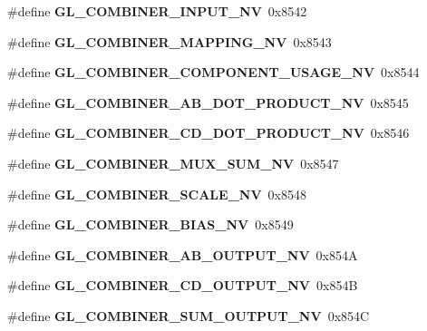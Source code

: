 \begin{DoxyCompactItemize}
\item 
\#define {\bfseries G\+L\+\_\+\+C\+O\+M\+B\+I\+N\+E\+R\+\_\+\+I\+N\+P\+U\+T\+\_\+\+N\+V}~0x8542\label{_s_d_l__opengl_8h_acf47936943c4cb3a44e7759ba589a2bb}

\item 
\#define {\bfseries G\+L\+\_\+\+C\+O\+M\+B\+I\+N\+E\+R\+\_\+\+M\+A\+P\+P\+I\+N\+G\+\_\+\+N\+V}~0x8543\label{_s_d_l__opengl_8h_a7b3d91e844bdfe508cb18e16b3b14c8f}

\item 
\#define {\bfseries G\+L\+\_\+\+C\+O\+M\+B\+I\+N\+E\+R\+\_\+\+C\+O\+M\+P\+O\+N\+E\+N\+T\+\_\+\+U\+S\+A\+G\+E\+\_\+\+N\+V}~0x8544\label{_s_d_l__opengl_8h_add52627ebaf78ad5374e17435b1bad64}

\item 
\#define {\bfseries G\+L\+\_\+\+C\+O\+M\+B\+I\+N\+E\+R\+\_\+\+A\+B\+\_\+\+D\+O\+T\+\_\+\+P\+R\+O\+D\+U\+C\+T\+\_\+\+N\+V}~0x8545\label{_s_d_l__opengl_8h_a962d60fe8d7c581e25b60ed55c426345}

\item 
\#define {\bfseries G\+L\+\_\+\+C\+O\+M\+B\+I\+N\+E\+R\+\_\+\+C\+D\+\_\+\+D\+O\+T\+\_\+\+P\+R\+O\+D\+U\+C\+T\+\_\+\+N\+V}~0x8546\label{_s_d_l__opengl_8h_ad15a48be9e3f50fd4a9692e76930e297}

\item 
\#define {\bfseries G\+L\+\_\+\+C\+O\+M\+B\+I\+N\+E\+R\+\_\+\+M\+U\+X\+\_\+\+S\+U\+M\+\_\+\+N\+V}~0x8547\label{_s_d_l__opengl_8h_a45deebc1bbaa4d760e611fa4e15f73a7}

\item 
\#define {\bfseries G\+L\+\_\+\+C\+O\+M\+B\+I\+N\+E\+R\+\_\+\+S\+C\+A\+L\+E\+\_\+\+N\+V}~0x8548\label{_s_d_l__opengl_8h_af593ab0f866947ed9f3903835ce7567e}

\item 
\#define {\bfseries G\+L\+\_\+\+C\+O\+M\+B\+I\+N\+E\+R\+\_\+\+B\+I\+A\+S\+\_\+\+N\+V}~0x8549\label{_s_d_l__opengl_8h_ab1d0ee0cfd498a12dedcc4b70e68e287}

\item 
\#define {\bfseries G\+L\+\_\+\+C\+O\+M\+B\+I\+N\+E\+R\+\_\+\+A\+B\+\_\+\+O\+U\+T\+P\+U\+T\+\_\+\+N\+V}~0x854\+A\label{_s_d_l__opengl_8h_a42f6d61992647e0647a8b55b56571568}

\item 
\#define {\bfseries G\+L\+\_\+\+C\+O\+M\+B\+I\+N\+E\+R\+\_\+\+C\+D\+\_\+\+O\+U\+T\+P\+U\+T\+\_\+\+N\+V}~0x854\+B\label{_s_d_l__opengl_8h_aa5c280de129437b502eebc7bb152bbe2}

\item 
\#define {\bfseries G\+L\+\_\+\+C\+O\+M\+B\+I\+N\+E\+R\+\_\+\+S\+U\+M\+\_\+\+O\+U\+T\+P\+U\+T\+\_\+\+N\+V}~0x854\+C\label{_s_d_l__opengl_8h_a7afda3e143a2d4db3c7d542b9103dc5b}


\end{DoxyCompactItemize}
